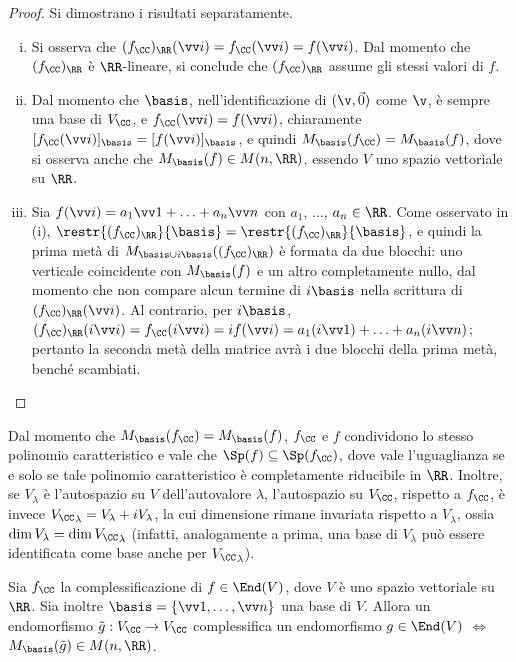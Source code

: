 \documentclass[11pt]{article}
\begin{document}
	\begin{proof}Si dimostrano i risultati separatamente.
		\begin{enumerate}[(i)]
			\item Si osserva che $(f_\CC)_\RR(\vv i) = f_\CC(\vv i) = f(\vv i)$. Dal momento che
			$(f_\CC)_\RR$ è $\RR$-lineare, si conclude che $(f_\CC)_\RR$ assume gli stessi valori
			di $f$.
			
			\item Dal momento che $\basis$, nell'identificazione di $(\v, \vec 0)$ come $\v$, è
			sempre una base di $V_\CC$, e $f_\CC(\vv i) = f(\vv i)$, chiaramente
			$[f_\CC(\vv i)]_\basis = [f(\vv i)]_\basis$, e quindi $M_\basis(f_\CC) = M_\basis(f)$,
			dove si osserva anche che $M_\basis(f) \in M(n, \RR)$, essendo $V$ uno spazio vettoriale
			su $\RR$.
			
			\item Sia $f(\vv i) = a_1 \vv 1 + \ldots + a_n \vv n$ con $a_1$, ..., $a_n \in \RR$. Come
			osservato in (i), $\restr{(f_\CC)_\RR}{\basis} = \restr{(f_\CC)_\RR}{\basis}$, e quindi
			la prima metà di $M_{\basis \cup i \basis}((f_\CC)_\RR)$ è formata da due blocchi: uno
			verticale coincidente con $M_\basis(f)$ e un altro completamente nullo, dal momento che
			non compare alcun termine di $i \basis$ nella scrittura di $(f_\CC)_\RR(\vv i)$. Al
			contrario, per $i \basis$, $(f_\CC)_\RR(i \vv i) = f_\CC(i \vv i) = i f(\vv i) = a_1 (i \vv 1) +
			\ldots + a_n (i \vv n)$; pertanto la seconda metà della matrice avrà i due blocchi della prima metà,
			benché scambiati.
		\end{enumerate}
	\end{proof}

	\begin{remark}
		Dal momento che $M_\basis(f_\CC) = M_\basis(f)$, $f_\CC$ e $f$ condividono lo stesso polinomio caratteristico
		e vale che $\Sp(f) \subseteq \Sp(f_\CC)$, dove vale l'uguaglianza se e solo se tale polinomio caratteristico
		è completamente riducibile in $\RR$. Inoltre, se $V_\lambda$ è l'autospazio su $V$ dell'autovalore $\lambda$, l'autospazio
		su $V_\CC$, rispetto a $f_\CC$, è invece ${V_\CC}_\lambda = V_\lambda + i V_\lambda$, la cui
		dimensione rimane invariata rispetto a $V_\lambda$, ossia $\dim V_\lambda = \dim {V_\CC}_\lambda$
		(infatti, analogamente a prima, una base di $V_\lambda$ può essere identificata come base
		anche per ${V_\CC}_\lambda$).
	\end{remark}

	\begin{proposition}
		Sia $f_\CC$ la complessificazione di $f \in \End(V)$, dove $V$ è uno spazio vettoriale su $\RR$.
		Sia inoltre $\basis = \{ \vv 1, \ldots, \vv n \}$ una base di $V$. Allora un endomorfismo
		$\tilde g : V_\CC \to V_\CC$ complessifica un endomorfismo $g \in \End(V)$ $\iff$ $M_\basis(\tilde g) \in M(n, \RR)$.
	\end{proposition}
\end{document}
